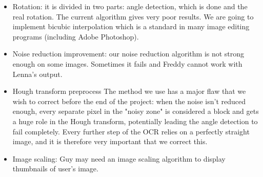\begin{itemize}

    \item{Rotation}: it is divided in two parts: angle detection, which is done
        and the real rotation. The current algorithm gives very poor results. We
        are going to implement bicubic interpolation which is a standard in many
        image editing programs (including Adobe Photoshop).
    
    \item{Noise reduction improvement}: our noise reduction algorithm is not
        strong enough on some images. Sometimes it fails and Freddy cannot work
        with Lenna's output.

    \item{Hough transform preprocess} The method we use has a major flaw that we wish to correct before the end of
        the project: when the noise isn't reduced enough, every separate pixel
        in the "noisy zone" is considered a block and gets a huge role in the
        Hough transform, potentially leading the angle detection to fail
        completely. Every further step of the OCR relies on a perfectly straight
        image, and it is therefore very important that we correct this.

    \item{Image scaling}: Guy may need an image scaling algorithm to display
        thumbnails of user's image.

\end{itemize}

